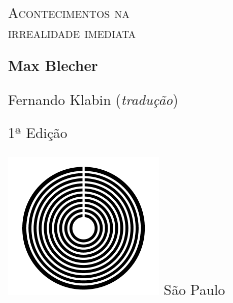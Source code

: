 




\begingroup\thispagestyle{empty}\vspace*{.05\textheight} 

              \formular
              \huge
              \noindent
              \textsc{Acontecimentos na\\irrealidade imediata}
  					  \medskip
                      
  					  \large
              \textit{}
              \normalsize 
              \vspace{2em}

              \Large
              \noindent
              \textbf{Max Blecher}
              \bigskip

              \small
              \noindent
              Fernando Klabin (\textit{tradução})
              \vspace{3em}

              \noindent
   					  1ª Edição
                      

              \vfill
              \noindent
              \includegraphics[width=0.3\textwidth]{logo}
              \break{} \footnotesize São Paulo\quad\the\year
\endgroup
\pagebreak
